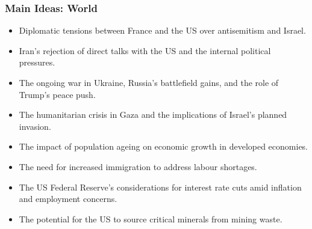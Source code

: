 \documentclass{beamer}
\begin{document}
\begin{frame}
\frametitle{Main Ideas: World}
\begin{itemize}
    \item Diplomatic tensions between France and the US over antisemitism and Israel.
    \item Iran's rejection of direct talks with the US and the internal political pressures.
    \item The ongoing war in Ukraine, Russia's battlefield gains, and the role of Trump's peace push.
    \item The humanitarian crisis in Gaza and the implications of Israel's planned invasion.
    \item The impact of population ageing on economic growth in developed economies.
    \item The need for increased immigration to address labour shortages.
    \item The US Federal Reserve's considerations for interest rate cuts amid inflation and employment concerns.
    \item The potential for the US to source critical minerals from mining waste.
\end{itemize}
\end{frame}
\end{document}

